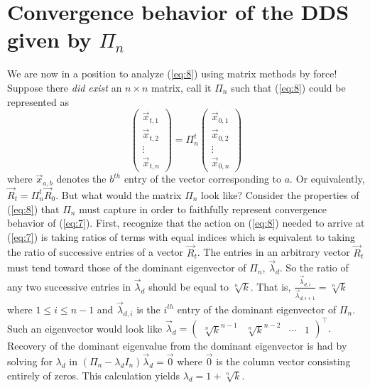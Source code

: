 \documentclass[11pt]{article}
\theoremstyle{plain}
\theoremstyle{definition}
\begin{document}
\section{Convergence behavior of the DDS given by $\Pi_n$}
We are now in a position to analyze (\ref{eq:8}) using matrix methods by force! Suppose there \emph{did exist} an $n\times n$ matrix, call it $\Pi_n$ such that (\ref{eq:8}) could be represented as
\begin{equation}\label{eq:11}
\left(\begin{array}{c}
\vec{x}_{t,1} \\
\vec{x}_{t,2} \\
\vdots \\
\vec{x}_{t,n}\end{array}\right)=\Pi_n^t
\left(\begin{array}{c}
\vec{x}_{0,1} \\
\vec{x}_{0,2} \\
\vdots \\
\vec{x}_{0,n}\end{array}\right)
\end{equation} where $\vec{x}_{a,b}$ denotes the $b^{th}$ entry of the vector corresponding to $a$.
Or equivalently, $\vec{R}_t=\Pi_n^t \vec{R}_0$. But what would the matrix $\Pi_n$ look like? Consider the properties of (\ref{eq:8}) that $\Pi_n$ must capture in order to faithfully represent convergence behavior of (\ref{eq:7}). First, recognize that the action on (\ref{eq:8}) needed to arrive at (\ref{eq:7}) is taking ratios of terms with equal indices which is equivalent to taking the ratio of successive entries of a vector $\vec{R}_t$. The entries in an arbitrary vector $\vec{R}_t$ must tend toward those of the dominant eigenvector of $\Pi_n$, $\vec{\lambda}_d$. So the ratio of any two successive entries in $\vec{\lambda}_d$ should be equal to $\sqrt[n]{k}$. That is, $\frac{\vec{\lambda}_{d,i}}{\vec{\lambda}_{d,i+1}}=\sqrt[n]{k}$ where $1\leq i\leq n-1$ and $\vec{\lambda}_{d,i}$ is the $i^{th}$ entry of the dominant eigenvector of $\Pi_n$. Such an eigenvector would look like $\vec{\lambda}_d=\left(\begin{array}{cccc}
\sqrt[n]{k}^{n-1} & \sqrt[n]{k}^{n-2} & \cdots & 1\end{array}\right)^\intercal.$
Recovery of the dominant eigenvalue from the dominant eigenvector is had by solving for $\lambda_d$ in $(\Pi_n-\lambda_d \textit{I}_n)\vec{\lambda}_d=\vec{0}$ where $\vec{0}$ is the column vector consisting entirely of zeros. This calculation yields $\lambda_d=1+\sqrt[n]{k}$.
\end{document}
